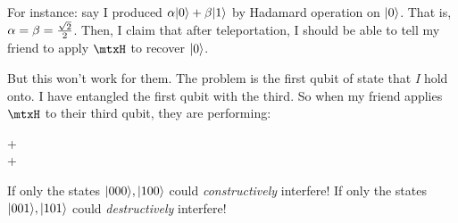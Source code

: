 \begin{remark}
  For instance: say I produced $\alpha |0\rangle + \beta |1\rangle$ by Hadamard
  operation on $|0\rangle$. That is, $\alpha = \beta = \frac{\sqrt{2}}{2}$. Then, I
  claim that after teleportation, I should be able to tell my friend to
  apply $\mtxH$ to recover $|0\rangle$.

  But this won't work for them. The problem is the first qubit of state
  that \emph{I} hold onto. I have entangled the first qubit with the
  third. So when my friend applies $\mtxH$ to their third qubit, they
  are performing:

  \begin{nedqn}
    \parens{\mtxI \otimes \mtxI \otimes \mtxH}
    \parens{\sqtot \zzzket + \sqtot \ozoket}
  \eqcol
    \parens{
      \sqtot \zzket
      \otimes
      \mtxH \zket
    }
    +
    \parens{
      \sqtot \ozket
      \otimes
      \mtxH \oket
    }
  \\
  \eqcol
    \half
    \parens{\zzzket + \zzoket}
    +
    \half
    \parens{\ozzket - \ozoket}
  \end{nedqn}

  \noindent
  If only the states $|000\rangle, |100\rangle$ could \emph{constructively}
  interfere! If only the states $|001\rangle, |101\rangle$ could
  \emph{destructively} interfere!
\end{remark}







